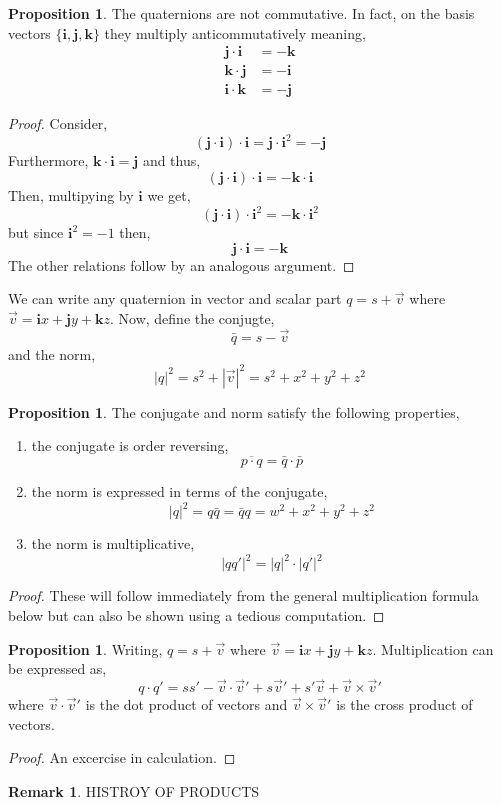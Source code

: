 \documentclass[12pt]{extarticle}
\theoremstyle{definition}
\newtheorem{proposition}[theorem]{Proposition}
\newtheorem{remark}{Remark}
\newenvironment{definition}[1][Definition:]{\begin{trivlist}
\item[\hskip \labelsep {\bfseries #1}]}{\end{trivlist}}
\renewcommand{\bf}[1]{\mathbf{#1}}
\newcommand{\rd}[1]{{ \color{red} #1 }}
\begin{document}
\begin{proposition}
The quaternions are not commutative. In fact, on the basis vectors $\{ \bf{i}, \bf{j}, \bf{k} \}$ they multiply anticommutatively meaning,
\begin{align*}
\bf{j} \cdot \bf{i} & = - \bf{k}
\\
\bf{k} \cdot \bf{j} & = - \bf{i}
\\
\bf{i} \cdot \bf{k} & = - \bf{j}
\end{align*}
\end{proposition}

\begin{proof}
Consider,
\[  (\bf{j} \cdot \bf{i}) \cdot \bf{i} = \bf{j} \cdot \bf{i}^2 = - \bf{j} \]
Furthermore, $\bf{k} \cdot \bf{i} = \bf{j}$ and thus,
\[ (\bf{j} \cdot \bf{i}) \cdot \bf{i} = - \bf{k} \cdot \bf{i} \]
Then, multipying by $\bf{i}$ we get,
\[ (\bf{j} \cdot \bf{i}) \cdot \bf{i}^2 = - \bf{k} \cdot \bf{i}^2 \]
but since $\bf{i}^2 = -1$ then,
\[ \bf{j} \cdot \bf{i} = - \bf{k} \]
The other relations follow by an analogous argument. 
\end{proof}

\begin{definition}
We can write any quaternion in vector and scalar part $q = s + \vec{v}$ where $\vec{v} = \bf{i} x + \bf{j} y + \bf{k} z$. Now, define the conjugte,
\[ \bar{q} = s - \vec{v} \]
and the norm,
\[ |q|^2 = s^2 + |\vec{v}|^{2} = s^2 + x^2 + y^2 + z^2 \]
\end{definition}

\begin{proposition}
The conjugate and norm satisfy the following properties,
\begin{enumerate}
\item the conjugate is order reversing,
\[ \overline{p \cdot q} = \bar{q} \cdot \bar{p} \]
\item the norm is expressed in terms of the conjugate,
\[ |q|^2 = q \bar{q} = \bar{q} q = w^2 + x^2 + y^2 + z^2 \]
\item the norm is multiplicative,
\[ |q q'|^2 = |q|^2 \cdot |q'|^2 \]
\end{enumerate}
\end{proposition}

\begin{proof}
These will follow immediately from the general multiplication formula below but can also be shown using a tedious computation.
\end{proof}

\begin{proposition}
Writing, $q = s + \vec{v}$ where $\vec{v} = \bf{i} x + \bf{j} y + \bf{k} z$. Multiplication can be expressed as,
\[ q \cdot q' = ss' - \vec{v} \cdot \vec{v}' + s \vec{v}' + s' \vec{v} + \vec{v} \times \vec{v}' \]
where $\vec{v} \cdot \vec{v}'$ is the dot product of vectors and $\vec{v} \times \vec{v}'$ is the cross product of vectors.
\end{proposition}
\rd{
\begin{proof}
An excercise in calculation. 
\end{proof}

\begin{remark}
HISTROY OF PRODUCTS
\end{remark} }
\end{document}
